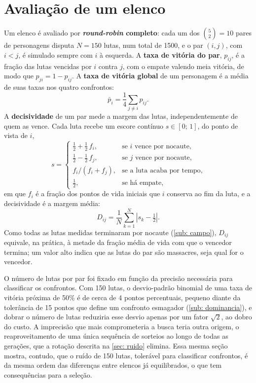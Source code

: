 \section{Avaliação de um elenco}
\label{sec: avaliacao}

Um elenco é avaliado por \textbf{\textit{round-robin} completo}: cada um dos $\binom{5}{2} = 10$ pares de personagens disputa $N = 150$ lutas, num total de 1500, e o par $(i, j)$, com $i < j$, é simulado sempre com $i$ à esquerda. A \textbf{taxa de vitória do par}, $p_{ij}$, é a fração das lutas vencidas por $i$ contra $j$, com o empate valendo meia vitória, de modo que $p_{ji} = 1 - p_{ij}$. A \textbf{taxa de vitória global} de um personagem é a média de suas taxas nos quatro confrontos:
\begin{equation}
    \label{eq: wr_global}
    \bar{p}_i = \frac{1}{4} \sum_{j \neq i} p_{ij}.
\end{equation}
A \textbf{decisividade} de um par mede a margem das lutas, independentemente de quem as vence. Cada luta recebe um escore contínuo $s \in [0;\, 1]$, do ponto de vista de $i$,
\begin{equation}
    \label{eq: escore}
    s =
    \begin{cases}
        \tfrac{1}{2} + \tfrac{1}{2}\, f_i, & \text{se } i \text{ vence por nocaute},\\[2pt]
        \tfrac{1}{2} - \tfrac{1}{2}\, f_j, & \text{se } j \text{ vence por nocaute},\\[2pt]
        f_i / (f_i + f_j), & \text{se a luta acaba por tempo},\\[2pt]
        \tfrac{1}{2}, & \text{se há empate},
    \end{cases}
\end{equation}
em que $f_i$ é a fração dos pontos de vida iniciais que $i$ conserva ao fim da luta, e a decisividade é a margem média:
\begin{equation}
    \label{eq: decisividade}
    D_{ij} = \frac{1}{N} \sum_{k=1}^{N} \left| s_k - \tfrac{1}{2} \right|.
\end{equation}
Como todas as lutas medidas terminaram por nocaute (\autoref{sub: campo}), $D_{ij}$ equivale, na prática, à metade da fração média de vida com que o vencedor termina; um valor alto indica que as lutas do par são massacres, seja qual for o vencedor.

O número de lutas por par foi fixado em função da precisão necessária para classificar os confrontos. Com 150 lutas, o desvio-padrão binomial de uma taxa de vitória próxima de 50\% é de cerca de 4 pontos percentuais, pequeno diante da tolerância de 15 pontos que define um confronto esmagador (\autoref{sub: dominancia}), e dobrar o número de lutas reduziria esse desvio apenas por um fator $\sqrt{2}$, ao dobro do custo. A imprecisão que mais comprometeria a busca teria outra origem, o reaproveitamento de uma única sequência de sorteios ao longo de todas as gerações, que a rotação descrita na \autoref{sec: ruido} elimina. Essa mesma seção mostra, contudo, que o ruído de 150 lutas, tolerável para classificar confrontos, é da mesma ordem das diferenças entre elencos já equilibrados, o que tem consequências para a seleção.

